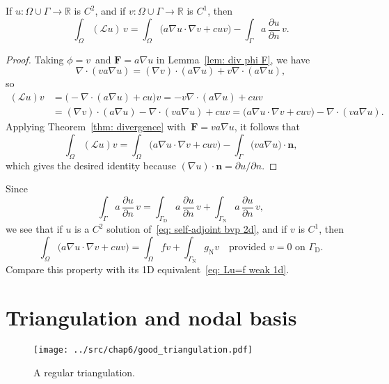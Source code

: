 \begin{theorem}\label{thm: first Green}
If $u:\Omega\cup\Gamma\to\mathbb{R}$ is $C^2$, and if 
$v:\Omega\cup\Gamma\to\mathbb{R}$ is $C^1$, then
\[
\int_\Omega(\mathcal{L}u)\,v
	=\int_\Omega\bigl(a\nabla u\cdot\nabla v+cuv\bigr)
	-\int_\Gamma a\,\frac{\partial u}{\partial n}\,v.
\]
\end{theorem}
\begin{proof}
Taking $\phi=v$~and $\boldsymbol{F}=a\nabla u$ in Lemma~\ref{lem: div phi F}, 
we have
\[
\nabla\cdot(va\nabla u)=(\nabla v)\cdot(a\nabla u)+v\nabla\cdot(a\nabla u),
\]
so
\begin{align*}
(\mathcal{L}u)v&=\bigl(-\nabla\cdot(a\nabla u)+cu\bigr)v
	=-v\nabla\cdot(a\nabla u)+cuv\\
	&=(\nabla v)\cdot(a\nabla u)-\nabla\cdot(va\nabla u)+cuv
	=\bigl(a\nabla u\cdot\nabla v+cuv)-\nabla\cdot(va\nabla u).
\end{align*}
Applying Theorem~\ref{thm: divergence} with~$\boldsymbol{F}=va\nabla u$, it 
follows that
\[
\int_\Omega(\mathcal{L}u)v=\int_\Omega\bigl(a\nabla u\cdot\nabla v+cuv\bigr)
	-\int_\Gamma\boldsymbol(va\nabla u)\cdot\boldsymbol{n},
\]
which gives the desired identity because 
$(\nabla u)\cdot\boldsymbol{n}=\partial u/\partial n$.
\end{proof}

Since 
\[
\int_\Gamma a\,\frac{\partial u}{\partial n}\,v
	=\int_{\Gamma_{\mathrm{D}}} a\,\frac{\partial u}{\partial n}\,v
	+\int_{\Gamma_{\mathrm{N}}} a\,\frac{\partial u}{\partial n}\,v,
\]
we see that if $u$ is a $C^2$ solution of~\eqref{eq: self-adjoint bvp 2d}, and 
if $v$ is $C^1$, then
\begin{equation}\label{eq: Lu=f weak 2d}
\int_\Omega\bigl(a\nabla u\cdot\nabla v+cuv\bigr)=\int_\Omega fv
	+\int_{\Gamma_{\mathrm{N}}}g_{\mathrm{N}}v
	\quad\text{provided $v=0$ on $\Gamma_{\mathrm{D}}$.}
\end{equation}
Compare this property with its 1D equivalent~\eqref{eq: Lu=f weak 1d}.

\section{Triangulation and nodal basis}\label{sec: triangulation}

\begin{figure}
\caption{A regular triangulation.}\label{fig: good Th}
\begin{center}
\texttt{[image: ../src/chap6/good\_triangulation.pdf]}
\end{center}
\end{figure}

